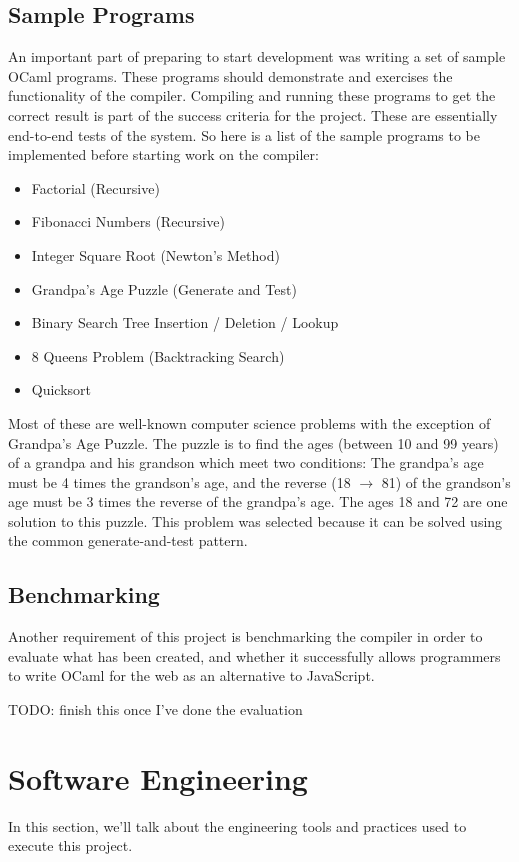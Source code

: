 \documentclass[12pt,a4paper,twoside,openright]{report}
\begin{document}
\subsection{Sample Programs}
An important part of preparing to start development was writing a set of sample OCaml programs.
These programs should demonstrate and exercises the functionality of the compiler.
Compiling and running these programs to get the correct result is part of the success criteria for the project.
These are essentially end-to-end tests of the system.
So here is a list of the sample programs to be implemented before starting work on the compiler:
\begin{itemize}
   \item Factorial (Recursive)
   \item Fibonacci Numbers (Recursive)
   \item Integer Square Root (Newton's Method)
   \item Grandpa's Age Puzzle (Generate and Test)
   \item Binary Search Tree Insertion / Deletion / Lookup
   \item 8 Queens Problem (Backtracking Search)
   \item Quicksort
\end{itemize}
Most of these are well-known computer science problems with the exception of Grandpa's Age Puzzle.
The puzzle is to find the ages (between 10 and 99 years) of a grandpa and his grandson which meet two conditions: The grandpa's age must be 4 times the grandson's age, and the reverse (18 $\rightarrow$ 81) of the grandson's age must be 3 times the reverse of the grandpa's age.
The ages 18 and 72 are one solution to this puzzle.
This problem was selected because it can be solved using the common generate-and-test pattern.

\subsection{Benchmarking}
Another requirement of this project is benchmarking the compiler in order to evaluate what has been created, and whether it successfully allows programmers to write OCaml for the web as an alternative to JavaScript.

TODO: finish this once I've done the evaluation

\section{Software Engineering}
In this section, we'll talk about the engineering tools and practices used to execute this project.
\end{document}
